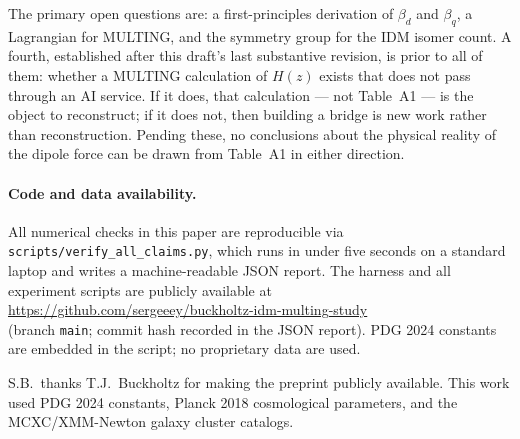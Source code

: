 \documentclass[twocolumn,prd,amsmath,amssymb,floatfix]{revtex4-2}
\begin{document}
The primary open questions are: a first-principles derivation of $\beta_d$
and $\beta_q$, a Lagrangian for MULTING, and the symmetry group for the
IDM isomer count.
A fourth, established after this draft's last substantive revision, is
prior to all of them: whether a MULTING calculation of $H(z)$ exists that
does not pass through an AI service.
If it does, that calculation --- not Table~A1 --- is the object to
reconstruct; if it does not, then building a bridge is new work rather
than reconstruction.
Pending these, no conclusions about the physical reality of the dipole
force can be drawn from Table~A1 in either direction.

\paragraph*{Code and data availability.}
All numerical checks in this paper are reproducible via
\texttt{scripts/verify\_all\_claims.py}, which runs in under five seconds
on a standard laptop and writes a machine-readable JSON report.
The harness and all experiment scripts are publicly available at\\
\url{https://github.com/sergeeey/buckholtz-idm-multing-study}\\
(branch \texttt{main}; commit hash recorded in the JSON report).
PDG 2024 constants are embedded in the script; no proprietary data are used.

\begin{acknowledgments}
S.B.\ thanks T.J.\ Buckholtz for making the preprint publicly available.
This work used PDG 2024 constants, Planck 2018 cosmological parameters, and
the MCXC/XMM-Newton galaxy cluster catalogs.
\end{acknowledgments}


\end{document}

